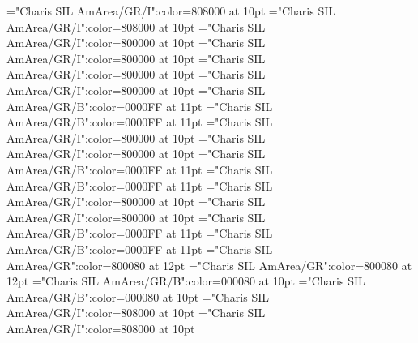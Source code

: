 \documentclass[a4paper,twoside]{article}
\begin{document}
\font\spanesrestrictionsminorentryvariant="Charis SIL AmArea/GR/I":color=808000 at 10pt
\font\spanrestrictionsminorentryvariant="Charis SIL AmArea/GR/I":color=808000 at 10pt
\font\spanescommentminorentryvariant="Charis SIL AmArea/GR/I":color=800000 at 10pt
\font\spancommentminorentryvariant="Charis SIL AmArea/GR/I":color=800000 at 10pt
\font\spanesabbreviationvariantentrytypevariantentrytypesvariantformentrybackrefsminorentryvariant="Charis SIL AmArea/GR/I":color=800000 at 10pt
\font\spanabbreviationvariantentrytypevariantentrytypesvariantformentrybackrefsminorentryvariant="Charis SIL AmArea/GR/I":color=800000 at 10pt
\font\spanmxbheadwordvariantformentrybackrefvariantformentrybackrefsminorentryvariant="Charis SIL AmArea/GR/B":color=0000FF at 11pt
\font\spanheadwordvariantformentrybackrefvariantformentrybackrefsminorentryvariant="Charis SIL AmArea/GR/B":color=0000FF at 11pt
\font\spanesabbreviationvariantentrytypevariantentrytypesvariantformentrybackrefsbminorentryvariant="Charis SIL AmArea/GR/I":color=800000 at 10pt
\font\spanabbreviationvariantentrytypevariantentrytypesvariantformentrybackrefsbminorentryvariant="Charis SIL AmArea/GR/I":color=800000 at 10pt
\font\spanmxbheadwordvariantformentrybackrefbvariantformentrybackrefsbminorentryvariant="Charis SIL AmArea/GR/B":color=0000FF at 11pt
\font\spanheadwordvariantformentrybackrefbvariantformentrybackrefsbminorentryvariant="Charis SIL AmArea/GR/B":color=0000FF at 11pt
\font\spanesownertypeabbreviationminimallexreferenceminimallexreferencesminorentryvariant="Charis SIL AmArea/GR/I":color=800000 at 10pt
\font\spanownertypeabbreviationminimallexreferenceminimallexreferencesminorentryvariant="Charis SIL AmArea/GR/I":color=800000 at 10pt
\font\spanmxbheadwordconfigtargetconfigtargetsminimallexreferenceminimallexreferencesminorentryvariant="Charis SIL AmArea/GR/B":color=0000FF at 11pt
\font\spanheadwordconfigtargetconfigtargetsminimallexreferenceminimallexreferencesminorentryvariant="Charis SIL AmArea/GR/B":color=0000FF at 11pt
\font\spanesliteralmeaningminorentryvariant="Charis SIL AmArea/GR":color=800080 at 12pt
\font\spanliteralmeaningminorentryvariant="Charis SIL AmArea/GR":color=800080 at 12pt
\font\spanmxbexampleexamplescontentsmainentrysubsenses="Charis SIL AmArea/GR/B":color=000080 at 10pt
\font\spanexampleexamplescontentsmainentrysubsenses="Charis SIL AmArea/GR/B":color=000080 at 10pt
\font\spanesownertypeabbreviationlexsensereferencelexsensereferencesmainentrysubsenses="Charis SIL AmArea/GR/I":color=808000 at 10pt
\font\spanownertypeabbreviationlexsensereferencelexsensereferencesmainentrysubsenses="Charis SIL AmArea/GR/I":color=808000 at 10pt
\end{document}
